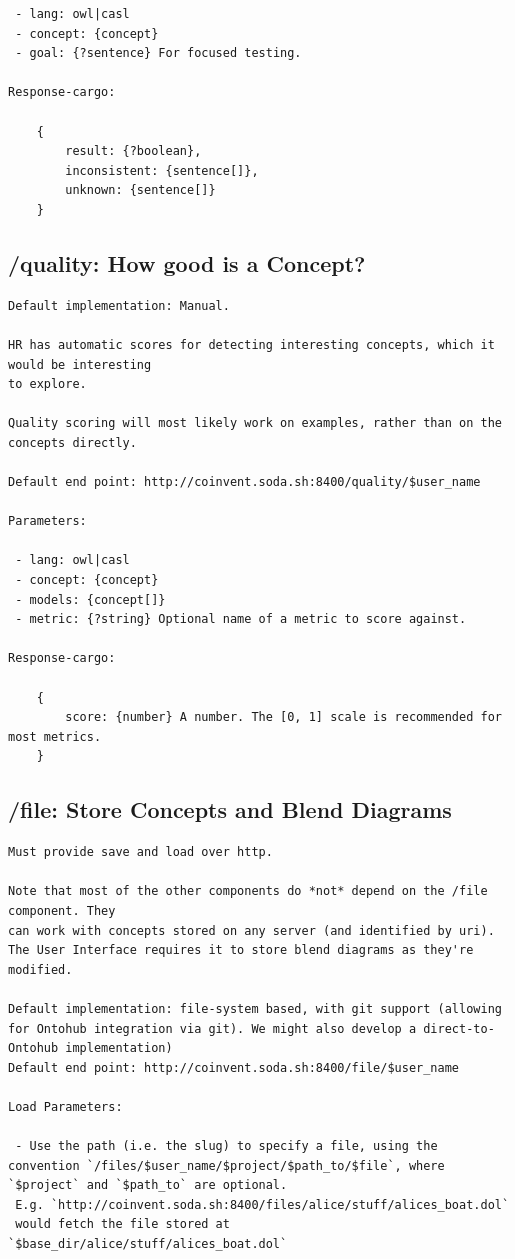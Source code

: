 \documentclass[a4paper,twoside,11pt]{article}
\begin{document}
\begin{appendices}
\begin{verbatim}
 - lang: owl|casl
 - concept: {concept} 
 - goal: {?sentence} For focused testing.

Response-cargo: 
	
	{
		result: {?boolean},
		inconsistent: {sentence[]},
		unknown: {sentence[]}
	}

\end{verbatim}
\subsection{/quality: How good is a Concept?}
\begin{verbatim}
Default implementation: Manual.

HR has automatic scores for detecting interesting concepts, which it would be interesting
to explore.

Quality scoring will most likely work on examples, rather than on the concepts directly.
 
Default end point: http://coinvent.soda.sh:8400/quality/$user_name

Parameters:

 - lang: owl|casl
 - concept: {concept}
 - models: {concept[]} 
 - metric: {?string} Optional name of a metric to score against.

Response-cargo: 
	
	{
		score: {number} A number. The [0, 1] scale is recommended for most metrics.
	}
\end{verbatim}

\subsection{/file: Store Concepts and Blend Diagrams}
\begin{verbatim}
Must provide save and load over http.

Note that most of the other components do *not* depend on the /file component. They
can work with concepts stored on any server (and identified by uri). The User Interface requires it to store blend diagrams as they're modified.

Default implementation: file-system based, with git support (allowing for Ontohub integration via git). We might also develop a direct-to-Ontohub implementation)   
Default end point: http://coinvent.soda.sh:8400/file/$user_name

Load Parameters: 

 - Use the path (i.e. the slug) to specify a file, using the convention `/files/$user_name/$project/$path_to/$file`, where `$project` and `$path_to` are optional.
 E.g. `http://coinvent.soda.sh:8400/files/alice/stuff/alices_boat.dol`
 would fetch the file stored at `$base_dir/alice/stuff/alices_boat.dol`


\end{verbatim}
\end{appendices}
\end{document}
